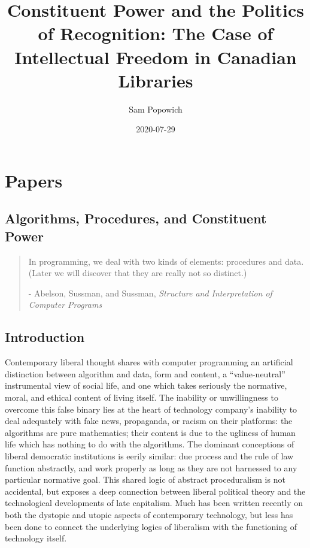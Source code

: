 \documentclass[12pt,oneside]{memoir}
\title{Constituent Power and the Politics of Recognition: The Case of Intellectual Freedom in Canadian Libraries}
\author{Sam Popowich}
\date{2020-07-29}
\begin{document}
\maketitle
\clearpage


\tableofcontents


\newpage
\setcounter{page}{1}

\mainmatter

\chapter{Papers}
\label{scrivauto:5}

\section{Algorithms, Procedures, and Constituent Power}
\label{scrivauto:6}


\begin{quote}

In programming, we deal with two kinds of elements: procedures and data. (Later we will discover that they are really not so distinct.) 

- Abelson, Sussman, and Sussman, \emph{Structure and Interpretation of Computer Programs}

\end{quote}

\section*{Introduction}

Contemporary liberal thought shares with computer programming an artificial distinction between algorithm and data, form and content, a ``value-neutral'' instrumental view of social life, and one which takes seriously the normative, moral, and ethical content of living itself. The inability or unwillingness to overcome this false binary lies at the heart of technology company's inability to deal adequately with fake news, propaganda, or racism on their platforms: the algorithms are pure mathematics; their content is due to the ugliness of human life which has nothing to do with the algorithms. The dominant conceptions of liberal democratic institutions is eerily similar: due process and the rule of law function abstractly, and work properly as long as they are not harnessed to any particular normative goal. This shared logic of abstract proceduralism is not accidental, but exposes a deep connection between liberal political theory and the technological developments of late capitalism. Much has been written recently on both the dystopic and utopic aspects of contemporary technology, but less has been done to connect the underlying logics of liberalism with the functioning of technology itself.
\end{document}
